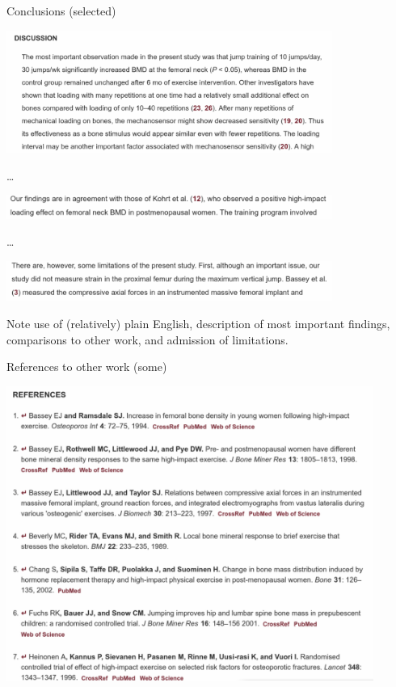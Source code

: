 \documentclass[unknownkeysallowed]{beamer}\usepackage[]{graphicx}\usepackage[]{color}
\begin{document}
\begin{frame}[fragile]{Conclusions (selected)}
  
  \includegraphics[width=0.8\textwidth]{conc1}  
  
  \ldots

  \includegraphics[width=0.8\textwidth]{conc2} 
  
  \ldots
  
  \includegraphics[width=0.8\textwidth]{conc3}  

Note use of (relatively) plain English, description of most important
findings, comparisons to other work, and admission of limitations.
  
\end{frame}

\begin{frame}[fragile]{References to other work (some)}
  
  \includegraphics[width=0.9\textwidth]{refs}  

  
\end{frame}
\end{document}
